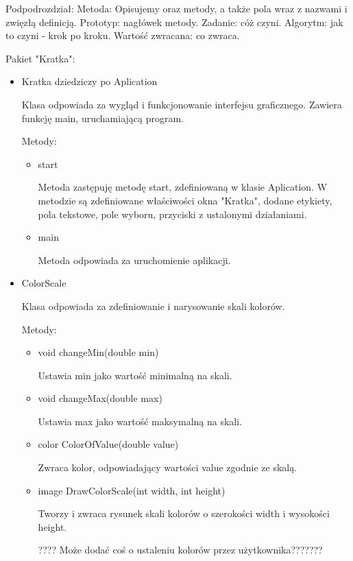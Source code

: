 \documentclass[]{article}
\begin{document}
Podpodrozdział: Metoda: Opisujemy oraz metody, a także pola wraz z nazwami i zwięzłą definicją. Prototyp: nagłówek metody. Zadanie: cóż czyni. Algorytm: jak to czyni - krok po kroku. Wartość zwracana: co zwraca.

Pakiet "Kratka":
\begin{itemize}
    \item Kratka dziedziczy po Aplication
    
    Klasa odpowiada za wygląd i funkcjonowanie interfejsu graficznego. Zawiera funkcję main, uruchamiającą program. 
    
    Metody:
    \begin{itemize}
        \item start
        
        Metoda zastępuję metodę start, zdefiniowaną w klasie Aplication. W metodzie są zdefiniowane właściwości okna "Kratka", dodane etykiety, pola tekstowe, pole wyboru, przyciski z ustalonymi działaniami. 
        \item main
        
        Metoda odpowiada za uruchomienie aplikacji.
        
    \end{itemize}
    \item ColorScale
    
    Klasa odpowiada za zdefiniowanie i narysowanie skali kolorów.
    
    Metody:
    \begin{itemize}
    \item void changeMin(double min)
    
    Ustawia min jako wartość minimalną na skali. 
    \item void changeMax(double max)
    
    Ustawia max jako wartość maksymalną na skali.
    \item color ColorOfValue(double value)
    
    Zwraca kolor, odpowiadający wartości value zgodnie ze skalą.
    \item image DrawColorScale(int width, int height)
    
    Tworzy i zwraca rysunek skali kolorów o szerokości width i wysokości height. 
    
    ???? Może dodać coś o ustaleniu kolorów przez użytkownika???????
    \end{itemize}
\end{itemize}
\end{document}
